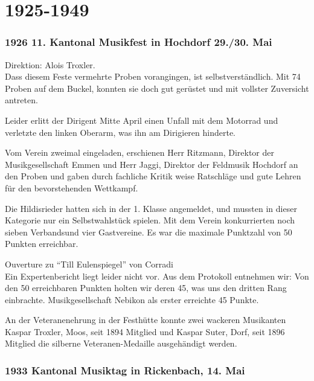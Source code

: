 \section*{1925-1949}

\begin{history}

    \subsubsection*{1926 11. Kantonal Musikfest in Hochdorf 29./30. Mai}

    Direktion: Alois Troxler.\\
    Dass diesem Feste vermehrte Proben vorangingen, ist selbstverständlich. Mit
    74 Proben auf dem Buckel, konnten sie doch gut gerüstet und mit vollster
    Zuversicht antreten.

    Leider erlitt der Dirigent Mitte April einen Unfall mit dem Motorrad und
    verletzte den linken Oberarm, was ihn am Dirigieren hinderte.

    Vom Verein zweimal eingeladen, erschienen Herr Ritzmann, Direktor der
    Musikgesellschaft Emmen und Herr Jaggi, Direktor der Feldmusik Hochdorf an
    den Proben und gaben durch fachliche Kritik weise Ratschläge und gute Lehren
    für den bevorstehenden Wettkampf.

    Die Hildisrieder hatten sich in der 1. Klasse angemeldet, und mussten in
    dieser Kategorie nur ein Selbstwahlstück spielen. Mit dem Verein
    konkurrierten noch sieben Verbandsund vier Gastvereine. Es war die maximale
    Punktzahl von 50 Punkten erreichbar.

    Ouverture zu \enquote{Till Eulenspiegel} von Corradi\\
    Ein Expertenbericht liegt leider nicht vor. Aus dem Protokoll entnehmen wir:
    Von den 50 erreichbaren Punkten holten wir deren 45, was uns den dritten
    Rang einbrachte. Musikgesellschaft Nebikon als erster erreichte 45 Punkte.

    An der Veteranenehrung in der Festhütte konnte zwei wackeren Musikanten
    Kaspar Troxler, Moos, seit 1894 Mitglied und Kaspar Suter, Dorf, seit 1896
    Mitglied die silberne Veteranen-Medaille ausgehändigt werden.


    \subsubsection*{1933 Kantonal Musiktag in Rickenbach, 14. Mai}


\end{history}
